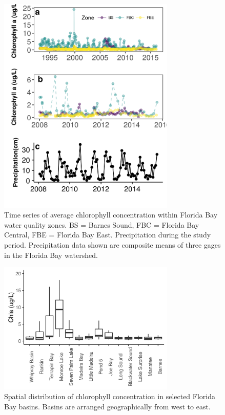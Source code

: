 \begin{figure}
  \centering
  \includegraphics[width=0.75\textwidth]{../../figures/chltimeseries.png}
  \caption{Time series of average chlorophyll concentration within Florida Bay water quality zones. BS = Barnes Sound, FBC = Florida Bay Central, FBE = Florida Bay East. Precipitation during the study period. Precipitation data shown are composite means of three gages in the Florida Bay watershed.}
  \label{fig:2}
\end{figure}

\begin{figure}
  \centering
  \includegraphics[width=0.75\textwidth]{../../figures/chlboxplot.png}
  \caption{Spatial distribution of chlorophyll concentration in selected Florida Bay basins. Basins are arranged geographically from west to east.}
  \label{fig:3}
\end{figure}


